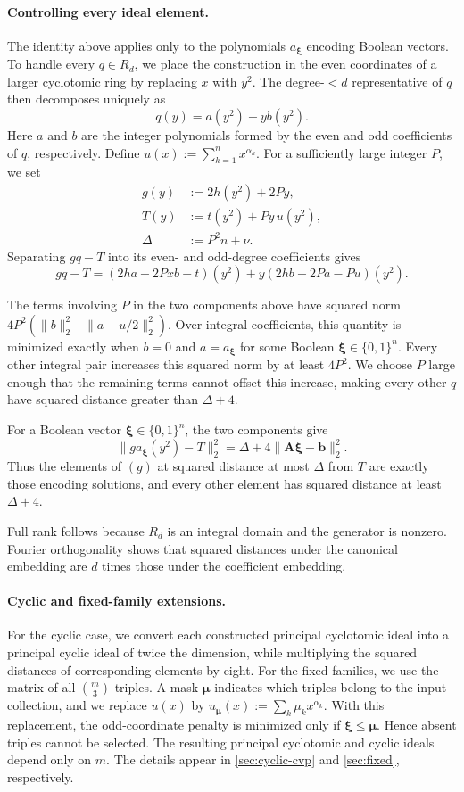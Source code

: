 \paragraph{Controlling every ideal element.}
The identity above applies only to the polynomials
\(a_{\boldsymbol\xi}\) encoding Boolean vectors.  To handle every
\(q\in R_d\), we place the construction in the even coordinates of a larger
cyclotomic ring by replacing \(x\) with \(y^2\).  The degree-\(<d\)
representative of \(q\) then decomposes uniquely as
\[
 q(y)=a(y^2)+yb(y^2).
\]
Here \(a\) and \(b\) are the integer polynomials formed by the
even and odd coefficients of \(q\), respectively.  Define
\(u(x):=\sum_{k=1}^n x^{\alpha_k}\).
For a sufficiently large integer \(P\), we set
\[
 \begin{aligned}
 g(y)&:=2h(y^2)+2Py,\\
 T(y)&:=t(y^2)+Py\,u(y^2),\\
 \Delta&:=P^2n+\nu.
 \end{aligned}
\]
Separating \(gq-T\) into its even- and
odd-degree coefficients gives
\[
 gq-T=(2ha+2Pxb-t)(y^2)+y(2hb+2Pa-Pu)(y^2).
\]

The terms involving \(P\) in the two components above have
squared norm
\(4P^2(\|b\|_2^2+\|a-u/2\|_2^2)\).  Over integral
coefficients, this quantity is minimized exactly when \(b=0\) and
\(a=a_{\boldsymbol\xi}\) for some Boolean
\(\boldsymbol\xi\in\{0,1\}^n\).  Every other integral pair increases this
squared norm by at least \(4P^2\).  We choose \(P\) large enough that the
remaining terms cannot offset this increase, making every other \(q\) have
squared distance greater than \(\Delta+4\).

For a Boolean vector \(\boldsymbol\xi\in\{0,1\}^n\), the two components give
\[
 \|g a_{\boldsymbol\xi}(y^2)-T\|_2^2
 =\Delta
  +4\|\mathbf A\boldsymbol\xi-\mathbf b\|_2^2.
\]
Thus the elements of \((g)\) at squared distance at most
\(\Delta\) from \(T\) are exactly those
encoding solutions, and every other element has squared distance at least
\(\Delta+4\).

Full rank follows because \(R_d\) is an integral domain and the generator is
nonzero.  Fourier orthogonality shows that squared distances under
the canonical embedding are \(d\) times those under the coefficient
embedding.

\paragraph{Cyclic and fixed-family extensions.}
For the cyclic case, we convert each constructed principal
cyclotomic ideal into a principal cyclic ideal of twice the dimension, while
multiplying the squared distances of corresponding elements by eight.
For the fixed families, we use the matrix of all
\(\binom m3\) triples.  A mask \(\boldsymbol\mu\) indicates which triples
belong to the input collection, and we replace \(u(x)\) by
\(u_{\boldsymbol\mu}(x):=\sum_k\mu_kx^{\alpha_k}\).  With this replacement,
the odd-coordinate penalty is minimized only if
\(\boldsymbol\xi\leq\boldsymbol\mu\).  Hence absent triples cannot be selected.
The resulting principal cyclotomic and cyclic ideals depend only
on \(m\).  The details appear in \cref{sec:cyclic-cvp} and
\cref{sec:fixed}, respectively.

